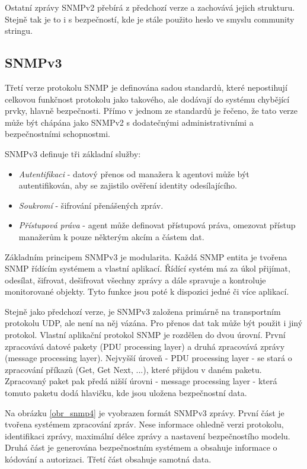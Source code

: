 Ostatní zprávy SNMPv2 přebírá z předchozí verze a zachovává jejich strukturu. Stejně tak je to i s bezpečností, kde je stále použito heslo ve smyslu community stringu.

\subsection*{SNMPv3}
Třetí verze protokolu SNMP je definována sadou standardů, které nepostihují celkovou funkčnost protokolu jako takového, ale 
dodávají do systému chybějící prvky, hlavně bezpečnosti. Přímo v jednom ze standardů \cite{RFC2570} je řečeno, že tato verze může být chápána jako 
SNMPv2 s dodatečnými administrativními a bezpečnostními schopnostmi.

SNMPv3 definuje tři základní služby:
\begin{itemize}
	\item \textit{Autentifikaci} - datový přenos od manažera k agentovi může být autentifikován, aby se zajistilo ověření identity odesílajícího.
	\item \textit{Soukromí} - šifrování přenášených zpráv.
	\item \textit{Přístupová práva} - agent může definovat přístupová práva, omezovat přístup manažerům k pouze některým akcím a částem dat.
\end{itemize}

Základním principem SNMPv3 je modularita. Každá SNMP entita je tvořena SNMP řídícím systémem a vlastní aplikací. Řídící systém má za úkol 
přijímat, odesílat, šifrovat, dešifrovat všechny zprávy a dále spravuje a kontroluje monitorované objekty. Tyto funkce jsou poté k dispozici jedné či více
aplikací.

Stejně jako předchozí verze, je SNMPv3 založena primárně na transportním protokolu UDP, ale není na něj vázána. Pro přenos dat tak může být použit i jiný protokol.
Vlastní aplikační protokol SNMP je rozdělen do dvou úrovní. První zpracovává datové pakety (PDU processing layer) a druhá zpracovává zprávy (message processing layer).
Nejvyšší úroveň - PDU processing layer - se stará o zpracování příkazů (Get, Get Next, ...), které přijdou v daném paketu. Zpracovaný paket pak předá nižší úrovni - 
message processing layer - která tomuto paketu dodá hlavičku, kde jsou uložena bezpečnostní data.

Na obrázku \ref{obr_snmp4} je vyobrazen formát SNMPv3 zprávy. První část je tvořena systémem zpracování zpráv. Nese informace ohledně verzi protokolu, identifikaci zprávy,
maximální délce zprávy a nastavení bezpečnostího modelu. Druhá část je generována bezpečnostním systémem a obsahuje informace o kódování a autorizaci. Třetí část obsahuje samotná 
data.


